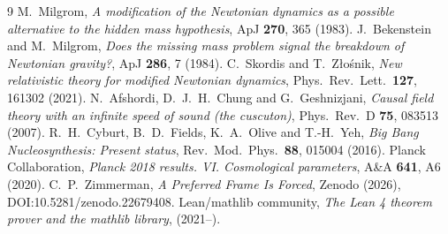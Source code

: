 \documentclass[11pt,letterpaper]{article}
\begin{document}
\begin{thebibliography}{9}
 M.~Milgrom, \emph{A modification of the Newtonian dynamics as a possible alternative to the hidden mass hypothesis}, ApJ \textbf{270}, 365 (1983).
 J.~Bekenstein and M.~Milgrom, \emph{Does the missing mass problem signal the breakdown of Newtonian gravity?}, ApJ \textbf{286}, 7 (1984).
 C.~Skordis and T.~Z\l{}o\'snik, \emph{New relativistic theory for modified Newtonian dynamics}, Phys.\ Rev.\ Lett.\ \textbf{127}, 161302 (2021).
 N.~Afshordi, D.~J.~H.~Chung and G.~Geshnizjani, \emph{Causal field theory with an infinite speed of sound (the cuscuton)}, Phys.\ Rev.\ D \textbf{75}, 083513 (2007).
 R.~H.~Cyburt, B.~D.~Fields, K.~A.~Olive and T.-H.~Yeh, \emph{Big Bang Nucleosynthesis: Present status}, Rev.\ Mod.\ Phys.\ \textbf{88}, 015004 (2016).
 Planck Collaboration, \emph{Planck 2018 results. VI. Cosmological parameters}, A\&A \textbf{641}, A6 (2020).
 C.~P.~Zimmerman, \emph{A Preferred Frame Is Forced}, Zenodo (2026), DOI:10.5281/zenodo.22679408.
 Lean/mathlib community, \emph{The Lean 4 theorem prover and the mathlib library}, (2021--).
\end{thebibliography}
\end{document}
